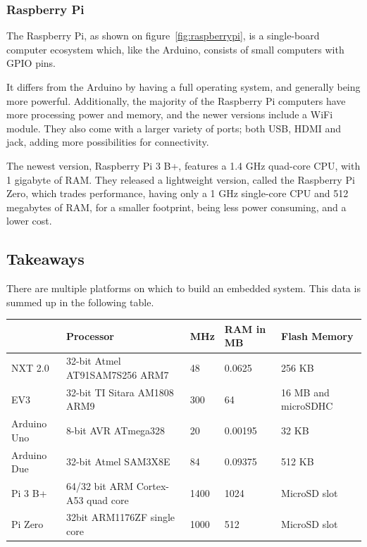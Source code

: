 \subsubsection{Raspberry Pi}\label{subsec:rpispecs}
The Raspberry Pi, as shown on figure~\autoref{fig:raspberrypi}, is a single-board computer ecosystem which, like the Arduino, consists of small computers with GPIO pins.

It differs from the Arduino by having a full operating system, and generally being more powerful.
Additionally, the majority of the Raspberry Pi computers have more processing power and memory, and the newer versions include a WiFi module.
They also come with a larger variety of ports; both USB, HDMI and jack, adding more possibilities for connectivity.

The newest version, Raspberry Pi 3 B+, features a 1.4 GHz quad-core CPU, with 1 gigabyte of RAM\cite{raspberrypi}.
They released a lightweight version, called the Raspberry Pi Zero, which trades performance, having only a 1 GHz single-core CPU and 512 megabytes of RAM, for a smaller footprint, being less power consuming, and a lower cost.

\subsection{Takeaways}
\label{platformtakeaways}
There are multiple platforms on which to build an embedded system.
This data is summed up in the following table.

\begin{table}[h]
	\begin{adjustbox}{max width=\textwidth}
	\begin{tabular}{|l|l|l|l|l|}
		\hline
		                & Processor                          & MHz 	& RAM in MB    & Flash Memory          	\\\hline
		NXT 2.0 		& 32-bit Atmel AT91SAM7S256 ARM7     & 48  	& 0.0625   & 256 KB                   	\\
		EV3     		& 32-bit TI Sitara AM1808 ARM9       & 300 	& 64   & 16 MB and microSDHC 			\\
		Arduino Uno    	& 8-bit AVR ATmega328                & 20  	& 0.00195    & 32 KB                    \\
		Arduino Due    	& 32-bit Atmel SAM3X8E               & 84  	& 0.09375   & 512 KB                   	\\
		Pi 3 B+      	& 64/32 bit ARM Cortex-A53 quad core & 1400 & 1024    & MicroSD slot            	\\
		Pi Zero       	& 32bit ARM1176ZF single core        & 1000 & 512  & MicroSD slot 					\\\hline
	\end{tabular}
\end{adjustbox}
\end{table}

